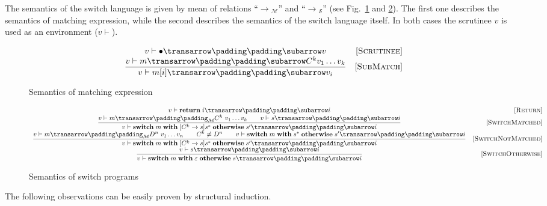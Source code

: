 The semantics of the switch language is given by mean of relations ``$\xrightarrow{}{}_{\!\!\!\mathcal M}$'' and ``$\xrightarrow{}{}_{\!\!\mathcal S}$''
(see Fig.~\ref{fig:matchexpr} and \ref{fig:test-and-branch}). The first one describes the semantics of matching expression, while
the second describes the semantics of the switch language itself. In both cases the scrutinee $v$ is used as an environment ($v\vdash$).


\begin{figure}
  \renewcommand*{\arraystretch}{2}
  \setarrow{\xrightarrow}
  \[
  \begin{array}{cr}
    \withenv{v}{\trans{\bullet}{}{v}} & \ruleno{Scrutinee} \\
    \trule{\withenv{v}{\trans{m}{}{C^k v_1\dots v_k}}}{\withenv{v}{\trans{m[i]}{}{v_i}}} & \ruleno{SubMatch} 
  \end{array}
  \]
  \caption{Semantics of matching expression}
  \label{fig:matchexpr}
\end{figure}

\begin{figure}
  \renewcommand*{\arraystretch}{3}
  \setarrow{\xrightarrow}
  \[
  \begin{array}{cr}
    \withenv{v}{\trans{\primi{return}\;i}{}{i}} & \ruleno{Return}\\
    \trule{{\setsubarrow{_{\mathcal M}}\withenv{v}{\trans{m}{}{C^k\ v_1 \dots v_k}}}\qquad \withenv{v}{\trans{s}{}{i}}}
          {\withenv{v}{\trans{\primi{switch}\;m\;\primi{with}\;[C^k\to s]s^*\;\primi{otherwise}\;s^\prime}{}{i}}} & \ruleno{SwitchMatched}\\
    \trule{{\setsubarrow{_{\mathcal M}}\withenv{v}{\trans{m}{}{D^n\  v_1 \dots v_n}}}\qquad C^k\ne D^n\qquad \withenv{v}{\trans{\primi{switch}\;m\;\primi{with}\;s^*\;\primi{otherwise}\;s^\prime}{}{i}}}
          {\withenv{v}{\trans{\primi{switch}\;m\;\primi{with}\;[C^k\to s]s^*\;\primi{otherwise}\;s^\prime}{}{i}}} & \ruleno{SwitchNotMatched}\\
    \trule{\withenv{v}{\trans{s}{}{i}}}{\withenv{v}{\trans{\primi{switch}\;m\;\primi{with}\;\varepsilon\;\primi{otherwise}\;s}{}{i}}} & \ruleno{SwitchOtherwise}
  \end{array}
  \]
  \caption{Semantics of switch programs}
  \label{fig:test-and-branch}
\end{figure}

The following observations can be easily proven by structural induction.

